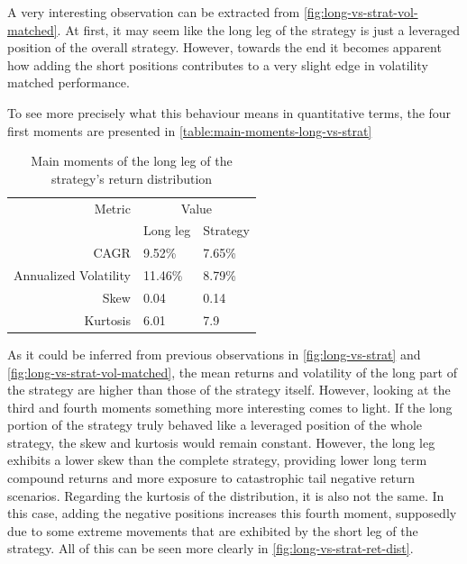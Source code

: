 A very interesting observation can be extracted from \autoref{fig:long-vs-strat-vol-matched}. At first, it may seem like the long leg of the strategy is just a leveraged position of the overall strategy. However, towards the end it becomes apparent how adding the short positions contributes to a very slight edge in volatility matched performance.

To see more precisely what this behaviour means in quantitative terms, the four first moments are presented in \autoref{table:main-moments-long-vs-strat}

\begin{table}[ht]
    \centering
    \begin{tabular}{rll}
        \toprule
        Metric & \multicolumn{2}{c}{Value} \\ 
        \cmidrule(lr){2-3}
            & Long leg & Strategy \\
        \midrule
        CAGR & 9.52\% & 7.65\% \\
        Annualized Volatility & 11.46\% & 8.79\% \\
        Skew & 0.04 & 0.14 \\
        Kurtosis & 6.01 & 7.9 \\
        \bottomrule
    \end{tabular}
    \caption{Main moments of the long leg of the strategy's return distribution}
    \label{table:main-moments-long-vs-strat}
\end{table}

As it could be inferred from previous observations in \autoref{fig:long-vs-strat} and \autoref{fig:long-vs-strat-vol-matched}, the mean returns and volatility of the long part of the strategy are higher than those of the strategy itself. However, looking at the third and fourth moments something more interesting comes to light. If the long portion of the strategy truly behaved like a leveraged position of the whole strategy, the skew and kurtosis would remain constant. However, the long leg exhibits a lower skew than the complete strategy, providing lower long term compound returns and more exposure to catastrophic tail negative return scenarios. Regarding the kurtosis of the distribution, it is also not the same. In this case, adding the negative positions increases this fourth moment, supposedly due to some extreme movements that are exhibited by the short leg of the strategy. All of this can be seen more clearly in \autoref{fig:long-vs-strat-ret-dist}.

